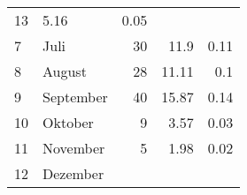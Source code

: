 \begin{longtable}{lXrrr}
       \num{13} &
       \num[round-mode=places,round-precision=2]{5.16} &
         \num[round-mode=places,round-precision=2]{0.05} \\

     7 &
     \multicolumn{1}{X}{ Juli   } &


       \num{30} &
       \num[round-mode=places,round-precision=2]{11.9} &
         \num[round-mode=places,round-precision=2]{0.11} \\

     8 &
     \multicolumn{1}{X}{ August   } &


       \num{28} &
       \num[round-mode=places,round-precision=2]{11.11} &
         \num[round-mode=places,round-precision=2]{0.1} \\

     9 &
     \multicolumn{1}{X}{ September   } &


       \num{40} &
       \num[round-mode=places,round-precision=2]{15.87} &
         \num[round-mode=places,round-precision=2]{0.14} \\

     10 &
     \multicolumn{1}{X}{ Oktober   } &


       \num{9} &
       \num[round-mode=places,round-precision=2]{3.57} &
         \num[round-mode=places,round-precision=2]{0.03} \\

     11 &
     \multicolumn{1}{X}{ November   } &


       \num{5} &
       \num[round-mode=places,round-precision=2]{1.98} &
         \num[round-mode=places,round-precision=2]{0.02} \\

     12 &
     \multicolumn{1}{X}{ Dezember   } &



\end{longtable}
